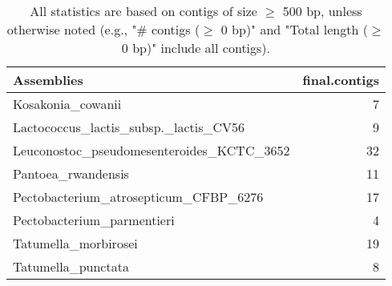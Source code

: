 \documentclass[12pt,a4paper]{article}
\begin{document}
\begin{table}[ht]
\begin{center}
\caption{All statistics are based on contigs of size $\geq$ 500 bp, unless otherwise noted (e.g., "\# contigs ($\geq$ 0 bp)" and "Total length ($\geq$ 0 bp)" include all contigs).}
\begin{tabular}{|l*{1}{|r}|}
\hline
Assemblies & final.contigs \\ \hline
Kosakonia\_cowanii & 7 \\ \hline
Lactococcus\_lactis\_subsp.\_lactis\_CV56 & 9 \\ \hline
Leuconostoc\_pseudomesenteroides\_KCTC\_3652 & 32 \\ \hline
Pantoea\_rwandensis & 11 \\ \hline
Pectobacterium\_atrosepticum\_CFBP\_6276 & 17 \\ \hline
Pectobacterium\_parmentieri & 4 \\ \hline
Tatumella\_morbirosei & 19 \\ \hline
Tatumella\_punctata & 8 \\ \hline
\end{tabular}
\end{center}
\end{table}
\end{document}
